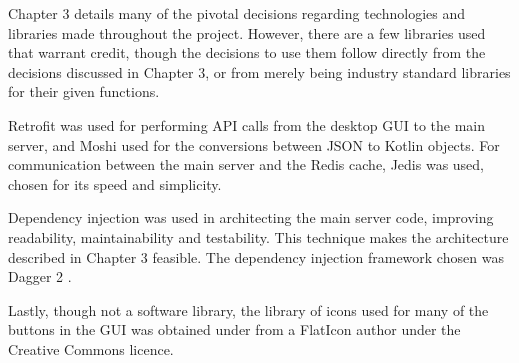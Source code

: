 Chapter 3 details many of the pivotal decisions regarding technologies and libraries made throughout the project. However, there are a few libraries used that warrant credit, though the decisions to use them follow directly from the decisions discussed in Chapter 3, or from merely being industry standard libraries for their given functions.

Retrofit \cite{retrofit} was used for performing API calls from the desktop GUI to the main server, and Moshi \cite{moshi} used for the conversions between JSON to Kotlin objects. For communication between the main server and the Redis cache, Jedis \cite{jedis} was used, chosen for its speed and simplicity.

Dependency injection was used in architecting the main server code, improving readability, maintainability and testability. This technique makes the architecture described in Chapter 3 feasible. The dependency injection framework chosen was Dagger 2 \cite{dagger2}.

Lastly, though not a software library, the library of icons used for many of the buttons in the GUI was obtained under from a FlatIcon author \cite{flaticon} under the Creative Commons licence.

